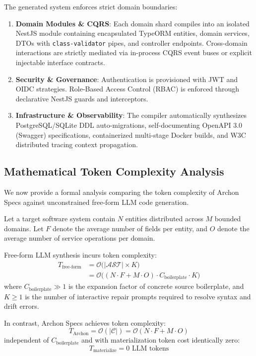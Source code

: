 The generated system enforces strict domain boundaries:
\begin{enumerate}[leftmargin=*]
  \item \textbf{Domain Modules \& CQRS}: Each domain shard compiles into an isolated NestJS module containing encapsulated TypeORM entities, domain services, DTOs with \texttt{class-validator} pipes, and controller endpoints. Cross-domain interactions are strictly mediated via in-process CQRS event buses or explicit injectable interface contracts.
  \item \textbf{Security \& Governance}: Authentication is provisioned with JWT and OIDC strategies. Role-Based Access Control (RBAC) is enforced through declarative NestJS guards and interceptors.
  \item \textbf{Infrastructure \& Observability}: The compiler automatically synthesizes PostgreSQL/SQLite DDL auto-migrations, self-documenting OpenAPI 3.0 (Swagger) specifications, containerized multi-stage Docker builds, and W3C distributed tracing context propagation.
\end{enumerate}

\subsection{Mathematical Token Complexity Analysis}
We now provide a formal analysis comparing the token complexity of Archon Specs against unconstrained free-form LLM code generation.

\begin{definition}
Let a target software system contain $N$ entities distributed across $M$ bounded domains. Let $F$ denote the average number of fields per entity, and $O$ denote the average number of service operations per domain.
\end{definition}

\begin{theorem}
\label{thm:token}
Free-form LLM synthesis incurs token complexity:
\begin{equation}
\begin{aligned}
  T_{\text{free-form}} &= \mathcal{O}\big(|\mathcal{AST}| \times K\big) \\
  &= \mathcal{O}\big((N \cdot F + M \cdot O) \cdot C_{\text{boilerplate}} \cdot K\big)
\end{aligned}
\end{equation}
where $C_{\text{boilerplate}} \gg 1$ is the expansion factor of concrete source boilerplate, and $K \ge 1$ is the number of interactive repair prompts required to resolve syntax and drift errors.

In contrast, Archon Specs achieves token complexity:
\begin{equation}
  T_{\text{Archon}} = \mathcal{O}(|\mathcal{C}|) = \mathcal{O}(N \cdot F + M \cdot O)
\end{equation}
independent of $C_{\text{boilerplate}}$ and with materialization token cost identically zero:
\begin{equation}
  T_{\text{materialize}} = 0 \text{ LLM tokens}
\end{equation}
\end{theorem}

